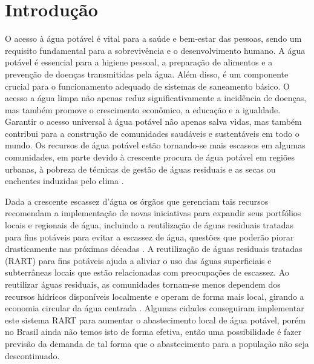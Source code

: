 


\section{Introdu{\c c}{\~a}o} \label{sec:int}


O acesso à água potável é vital para a saúde e bem-estar das pessoas, sendo um requisito fundamental para a sobrevivência e o desenvolvimento humano. A água potável é essencial para a higiene pessoal, a preparação de alimentos e a prevenção de doenças transmitidas pela água. Além disso, é um componente crucial para o funcionamento adequado de sistemas de saneamento básico. O acesso a água limpa não apenas reduz significativamente a incidência de doenças, mas também promove o crescimento econômico, a educação e a igualdade. Garantir o acesso universal à água potável não apenas salva vidas, mas também contribui para a construção de comunidades saudáveis e sustentáveis em todo o mundo. Os recursos de água potável estão tornando-se mais escassos em algumas comunidades, em parte devido à crescente procura de água potável em regiões urbanas, à pobreza de técnicas de gestão de águas residuais e as secas ou enchentes induzidas pelo clima
\cite{10.2166/wp.2022.071}.

Dada a crescente escassez d'água os órgãos que gerenciam tais recursos recomendam a implementação de novas iniciativas para expandir seus portfólios locais e regionais de água, incluindo a reutilização de águas residuais tratadas para fins potáveis para evitar a escassez de água, questões que poderão piorar drasticamente nas próximas décadas \cite{BARNES2023139587}. A reutilização de águas residuais tratadas (RART) para fins potáveis ajuda a aliviar o uso das águas superficiais e subterrâneas locais que estão relacionadas com preocupações de escassez. Ao reutilizar águas residuais, as comunidades tornam-se menos dependem dos recursos hídricos disponíveis localmente e operam de forma mais local, girando a economia circular da água centrada \cite{TSATSOU2023136325}. Algumas cidades conseguiram implementar este sistema RART para aumentar o abastecimento local de água potável, porém no Brasil ainda não temos isto de forma efetiva, então uma possibilidade é fazer previsão da demanda de tal forma que o abastecimento para a população não seja descontinuado. 

